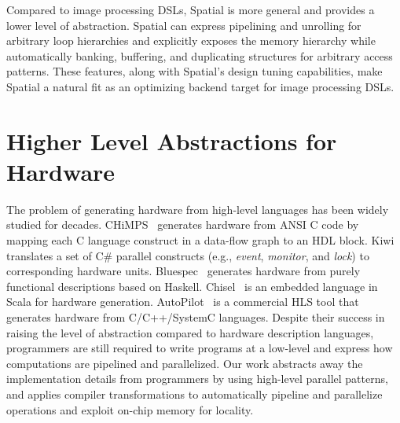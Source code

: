 Compared to image processing DSLs, Spatial is more general and provides a
lower level of abstraction. Spatial can express pipelining and unrolling for arbitrary loop hierarchies and explicitly exposes the memory hierarchy while automatically banking, buffering, and duplicating structures for arbitrary
access patterns. These features, along with Spatial's design tuning
capabilities, make Spatial a natural fit as an optimizing backend target for image processing DSLs.

\section{Higher Level Abstractions for Hardware}
The problem of generating hardware from high-level languages has been widely studied for
decades.  CHiMPS~\cite{chimps} generates hardware from ANSI C code by
mapping each C language construct in a data-flow graph to an HDL block.
Kiwi~\cite{kiwi} translates a set of C\# parallel constructs (e.g.,
\emph{event}, \emph{monitor}, and \emph{lock}) to corresponding hardware units.
Bluespec~\cite{bluespec} generates hardware from purely functional descriptions
based on Haskell.  Chisel~\cite{chisel} is an embedded language in Scala
for hardware generation.  AutoPilot~\cite{autopilot} is a commercial HLS
tool that generates hardware from C/C++/SystemC languages.  Despite their
success in raising the level of abstraction compared to hardware description
languages, programmers are still required to write programs at a low-level and
express how computations are pipelined and parallelized. Our work
abstracts away the implementation details from programmers by using high-level
parallel patterns, and applies compiler transformations to
automatically pipeline and parallelize operations and exploit on-chip memory
for locality.

